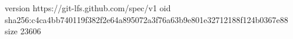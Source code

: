 version https://git-lfs.github.com/spec/v1
oid sha256:c4ca4bb740119f382f2e64a895072a3f76a63b9e801e32712188f124b0367e88
size 23606
